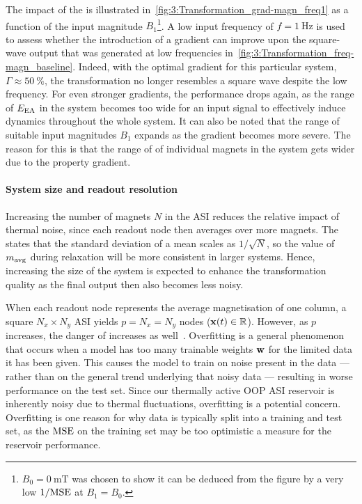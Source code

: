 The impact of the  is illustrated in~\cref{fig:3:Transformation_grad-magn_freq1} as a function of the input magnitude $B_1$\footnote{
	$B_0 = \SI{0}{\milli\tesla}$ was chosen to show it can be deduced from the figure by a very low $1/\mathrm{MSE}$ at $B_1 = B_0$.
}.
A low input frequency of $f=\SI{1}{\hertz}$ is used to assess whether the introduction of a gradient can improve upon the square-wave output that was generated at low frequencies in~\cref{fig:3:Transformation_freq-magn_baseline}.
Indeed, with the optimal gradient for this particular system, $\Gamma \approx \SI{50}{\percent}$, the transformation no longer resembles a square wave despite the low frequency.
For even stronger gradients, the performance drops again, as the range of  $E_\mathrm{EA}$ in the system becomes too wide for an input signal to effectively induce dynamics throughout the whole system.
It can also be noted that the range of suitable input magnitudes $B_1$ expands as the gradient becomes more severe.
The reason for this is that the range of  of individual magnets in the system gets wider due to the property gradient.

\paragraph{System size and readout resolution}
Increasing the number of magnets $N$ in the ASI reduces the relative impact of thermal noise, since each readout node then averages over more magnets.
The  states that the standard deviation of a mean scales as $1/\sqrt{N}$, so the value of $m_\mathrm{avg}$ during relaxation will be more consistent in larger systems.
Hence, increasing the size of the system is expected to enhance the transformation quality as the final output then also becomes less noisy. \\\par
When each readout node represents the average magnetisation of one column, a square $N_x \times N_y$ ASI yields $p = N_x = N_y$ nodes ($\boldsymbol{\mathbf{x}}(t) \in \mathbb{R}$).
However, as $p$ increases, the danger of  increases as well~\cite{DeepRC_IonGating_Overfitting,lukovsevivcius2009reservoir}.
Overfitting is a general  phenomenon that occurs when a model has too many trainable weights $\boldsymbol{\mathbf{w}}$ for the limited data it has been given.
This causes the model to train on noise present in the data --- rather than on the general trend underlying that noisy data --- resulting in worse performance on the test set.
Since our thermally active OOP ASI reservoir is inherently noisy due to thermal fluctuations, overfitting is a potential concern.
Overfitting is one reason for why data is typically split into a training and test set, as the $\mathrm{MSE}$ on the training set may be too optimistic a measure for the reservoir performance. \\\par

